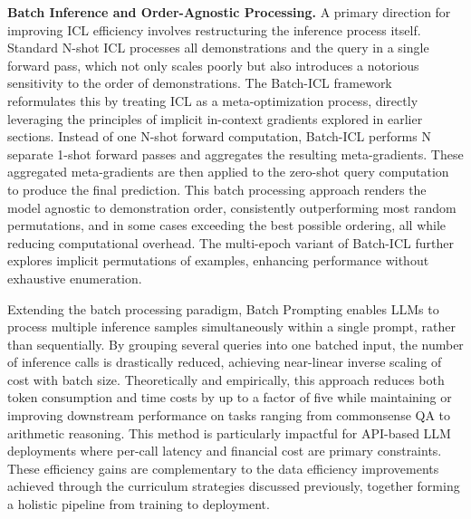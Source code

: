 \documentclass[11pt]{article}
\begin{document}
\textbf{Batch Inference and Order-Agnostic Processing.} A primary direction for improving ICL efficiency involves restructuring the inference process itself. Standard N-shot ICL processes all demonstrations and the query in a single forward pass, which not only scales poorly but also introduces a notorious sensitivity to the order of demonstrations. The Batch-ICL framework \cite{ref197} reformulates this by treating ICL as a meta-optimization process, directly leveraging the principles of implicit in-context gradients explored in earlier sections. Instead of one N-shot forward computation, Batch-ICL performs N separate 1-shot forward passes and aggregates the resulting meta-gradients. These aggregated meta-gradients are then applied to the zero-shot query computation to produce the final prediction. This batch processing approach renders the model agnostic to demonstration order, consistently outperforming most random permutations, and in some cases exceeding the best possible ordering, all while reducing computational overhead. The multi-epoch variant of Batch-ICL further explores implicit permutations of examples, enhancing performance without exhaustive enumeration.

Extending the batch processing paradigm, Batch Prompting \cite{ref205} enables LLMs to process multiple inference samples simultaneously within a single prompt, rather than sequentially. By grouping several queries into one batched input, the number of inference calls is drastically reduced, achieving near-linear inverse scaling of cost with batch size. Theoretically and empirically, this approach reduces both token consumption and time costs by up to a factor of five while maintaining or improving downstream performance on tasks ranging from commonsense QA to arithmetic reasoning. This method is particularly impactful for API-based LLM deployments where per-call latency and financial cost are primary constraints. These efficiency gains are complementary to the data efficiency improvements achieved through the curriculum strategies discussed previously, together forming a holistic pipeline from training to deployment.
\end{document}
